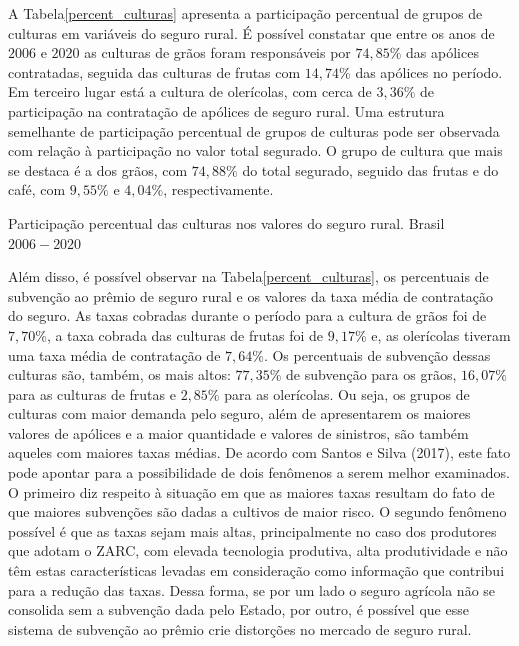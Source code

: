 A Tabela\ref{percent_culturas} apresenta a participação percentual de grupos de culturas em variáveis do seguro rural. É possível constatar que entre os anos de $2006$ e $2020$ as culturas de grãos foram responsáveis por $74,85\%$ das apólices contratadas, seguida das culturas de frutas com $14,74\%$ das apólices no período. Em terceiro lugar está a cultura de olerícolas, com cerca de $3,36\%$ de participação na contratação de apólices de seguro rural. Uma estrutura semelhante de participação percentual de grupos de culturas pode ser observada com relação à participação no valor total segurado. O grupo de cultura que mais se destaca é a dos grãos, com $74,88\%$ do total segurado, seguido das frutas e do café, com $9,55\%$ e $4,04\%$, respectivamente. 

\begin{small}
\begin{table}[H]
\caption{Participação percentual das culturas nos valores do seguro rural. Brasil $2006-2020$}\label{percent_culturas}
 
\end{table}
\end{small}

Além disso, é possível observar na Tabela\ref{percent_culturas}, os percentuais de subvenção ao prêmio de seguro rural e os valores da taxa média de contratação do seguro. As taxas cobradas durante o período para a cultura de grãos foi de $7,70\%$, a taxa cobrada das culturas de frutas foi de $9,17\%$ e, as olerícolas tiveram uma taxa média de contratação de $7,64\%$. Os percentuais de subvenção dessas culturas são, também, os mais altos: $77,35\%$ de subvenção para os grãos, $16,07\%$ para as culturas de frutas e $2,85\%$ para as olerícolas. Ou seja, os grupos de culturas com maior demanda pelo seguro, além de apresentarem os maiores valores de apólices e a maior quantidade e valores de sinistros, são também aqueles com maiores taxas médias. 
De acordo com  Santos e Silva (2017), este fato pode apontar para a possibilidade de dois fenômenos a serem melhor examinados. O primeiro diz respeito à situação em que as maiores taxas resultam do fato de que maiores subvenções são dadas a cultivos de maior risco. O segundo fenômeno possível é que as taxas sejam mais altas, principalmente no caso dos produtores que adotam o ZARC, com elevada tecnologia produtiva, alta produtividade e não têm estas características levadas em consideração como informação que contribui para a redução das taxas. Dessa forma, se por um lado o seguro agrícola não se consolida sem a subvenção dada pelo Estado, por outro, é possível que esse sistema de subvenção ao prêmio crie distorções no mercado de seguro rural. 

